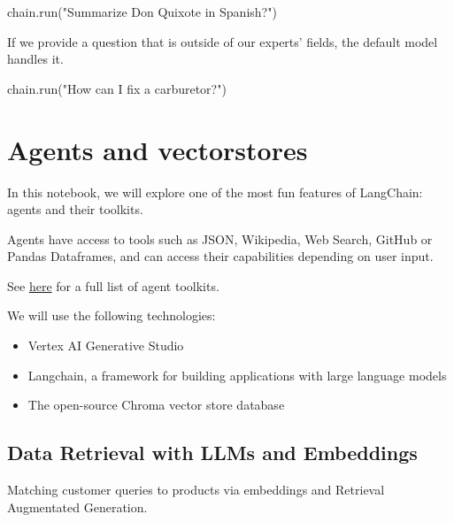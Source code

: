 \documentclass[
  letterpaper,
  DIV=11,
  numbers=noendperiod]{scrreprt}
\newenvironment{Shaded}{\begin{snugshade}}{\end{snugshade}}
\newcommand{\NormalTok}[1]{\textcolor[rgb]{0.00,0.23,0.31}{#1}}
\newcommand{\StringTok}[1]{\textcolor[rgb]{0.13,0.47,0.30}{#1}}
\begin{document}
\begin{Shaded}
\begin{Highlighting}[]
\NormalTok{chain.run(}\StringTok{"Summarize Don Quixote in Spanish?"}\NormalTok{)}
\end{Highlighting}
\end{Shaded}

If we provide a question that is outside of our experts' fields, the
default model handles it.

\begin{Shaded}
\begin{Highlighting}[]
\NormalTok{chain.run(}\StringTok{"How can I fix a carburetor?"}\NormalTok{)}
\end{Highlighting}
\end{Shaded}

\hypertarget{agents-and-vectorstores}{%
\chapter{Agents and vectorstores}\label{agents-and-vectorstores}}

In this notebook, we will explore one of the most fun features of
LangChain: agents and their toolkits.

Agents have access to tools such as JSON, Wikipedia, Web Search, GitHub
or Pandas Dataframes, and can access their capabilities depending on
user input.

See
\href{https://python.langchain.com/docs/integrations/toolkits/}{here}
for a full list of agent toolkits.

We will use the following technologies:

\begin{itemize}
\item
  Vertex AI Generative Studio
\item
  Langchain, a framework for building applications with large language
  models
\item
  The open-source Chroma vector store database
\end{itemize}

\hypertarget{data-retrieval-with-llms-and-embeddings}{%
\section{Data Retrieval with LLMs and
Embeddings}\label{data-retrieval-with-llms-and-embeddings}}

Matching customer queries to products via embeddings and Retrieval
Augmentated Generation.
\end{document}

